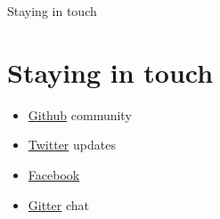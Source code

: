 \documentclass{beamer}
\begin{document}
\begin{frame}{Staying in touch}
    \section{Staying in touch}
    \begin{itemize}
        \item \href{https://github.com/reconmap}{Github} community
        \item \href{https://twitter.com/reconmap}{Twitter} updates
        \item \href{https://facebook.com/reconmap}{Facebook}
        \item \href{https://gitter.im/reconmap/community}{Gitter} chat
    \end{itemize}
\end{frame}
\end{document}
